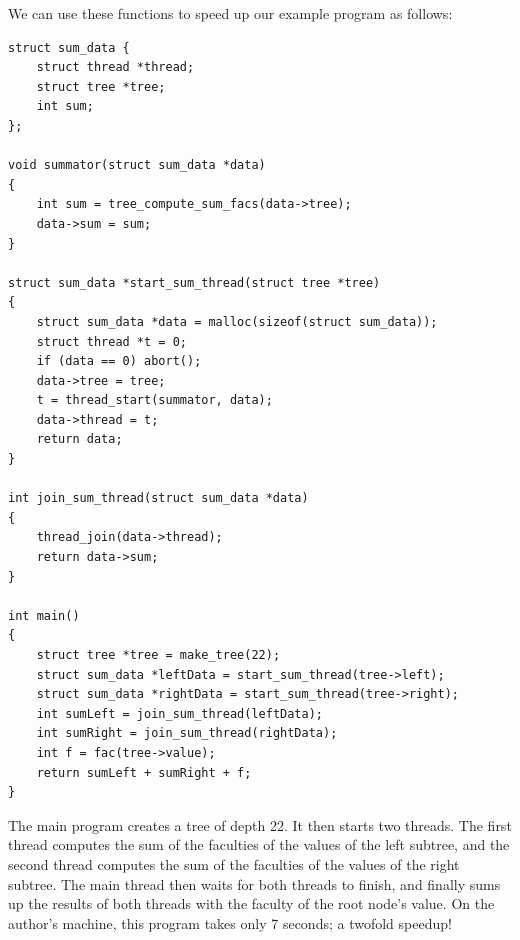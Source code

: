 \documentclass{article}
\begin{document}
We can use these functions to speed up our example program as
follows:
\begin{lstlisting}
struct sum_data {
    struct thread *thread;
    struct tree *tree;
    int sum;
};

void summator(struct sum_data *data)
{
    int sum = tree_compute_sum_facs(data->tree);
    data->sum = sum;
}

struct sum_data *start_sum_thread(struct tree *tree)
{
    struct sum_data *data = malloc(sizeof(struct sum_data));
    struct thread *t = 0;
    if (data == 0) abort();
    data->tree = tree;
    t = thread_start(summator, data);
    data->thread = t;
    return data;
}

int join_sum_thread(struct sum_data *data)
{
    thread_join(data->thread);
    return data->sum;
}

int main()
{
    struct tree *tree = make_tree(22);
    struct sum_data *leftData = start_sum_thread(tree->left);
    struct sum_data *rightData = start_sum_thread(tree->right);
    int sumLeft = join_sum_thread(leftData);
    int sumRight = join_sum_thread(rightData);
    int f = fac(tree->value);
    return sumLeft + sumRight + f;
}
\end{lstlisting}
The main program creates a tree of depth 22. It then starts two
threads. The first thread computes the sum of the faculties of
the values of the left subtree, and the second thread computes
the sum of the faculties of the values of the right subtree.
The main thread then waits for both threads to finish, and
finally sums up the results of both threads with the faculty of
the root node's value. On the author's machine, this program
takes only 7 seconds; a twofold speedup!
\end{document}
